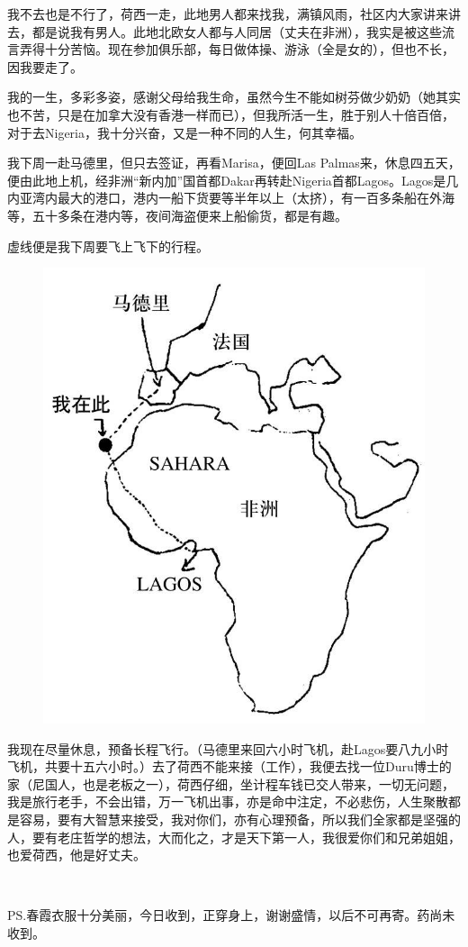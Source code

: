 \par 我不去也是不行了，荷西一走，此地男人都来找我，满镇风雨，社区内大家讲来讲去，都是说我有男人。此地北欧女人都与人同居（丈夫在非洲），我实是被这些流言弄得十分苦恼。现在参加俱乐部，每日做体操、游泳（全是女的），但也不长，因我要走了。
\par 我的一生，多彩多姿，感谢父母给我生命，虽然今生不能如树芬做少奶奶（她其实也不苦，只是在加拿大没有香港一样而已），但我所活一生，胜于别人十倍百倍，对于去Nigeria，我十分兴奋，又是一种不同的人生，何其幸福。
\par 我下周一赴马德里，但只去签证，再看Marisa，便回Las Palmas来，休息四五天，便由此地上机，经非洲“新内加”国首都Dakar再转赴Nigeria首都Lagos。Lagos是几内亚湾内最大的港口，港内一船下货要等半年以上（太挤），有一百多条船在外海等，五十多条在港内等，夜间海盗便来上船偷货，都是有趣。
\par 虚线便是我下周要飞上飞下的行程。
\begin{figure}[htb]
    \centering
    \includegraphics[scale=0.4]{picture/温柔的夜2.jpeg}
\end{figure}
\par 我现在尽量休息，预备长程飞行。（马德里来回六小时飞机，赴Lagos要八九小时飞机，共要十五六小时。）去了荷西不能来接（工作），我便去找一位Duru博士的家（尼国人，也是老板之一），荷西仔细，坐计程车钱已交人带来，一切无问题，我是旅行老手，不会出错，万一飞机出事，亦是命中注定，不必悲伤，人生聚散都是容易，要有大智慧来接受，我对你们，亦有心理预备，所以我们全家都是坚强的人，要有老庄哲学的想法，大而化之，才是天下第一人，我很爱你们和兄弟姐姐，也爱荷西，他是好丈夫。
\par {}
\par  
\par PS.春霞衣服十分美丽，今日收到，正穿身上，谢谢盛情，以后不可再寄。药尚未收到。



















